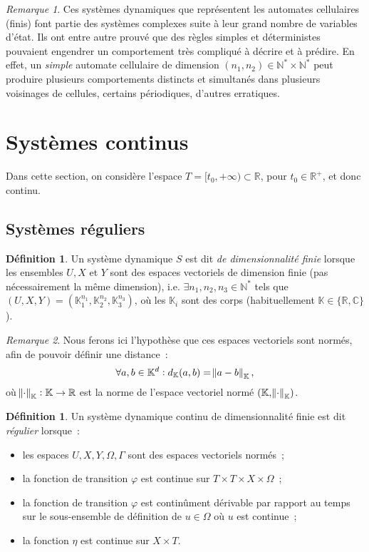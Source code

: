 \documentclass{article}
\theoremstyle{definition}
\newtheorem{déf}[thm]{Définition}
\theoremstyle{remark}
\newtheorem*{rmq}{Remarque}
\newcommand{\N}{\mathbb N}
\newcommand{\R}{\mathbb R}
\newcommand{\C}{\mathbb C}
\newcommand{\K}{\mathbb K}
\begin{document}
	\begin{rmq} Ces systèmes dynamiques que représentent les automates cellulaires (finis) font partie des systèmes complexes suite à leur grand nombre de
	variables d'état. Ils ont entre autre prouvé que des règles simples et déterministes pouvaient engendrer un comportement très compliqué à décrire et à
	prédire. En effet, un \textit{simple} automate cellulaire de dimension $(n_1, n_2) \in \N^* \times \N^*$ peut produire plusieurs comportements distincts
	et simultanés dans plusieurs voisinages de cellules, certains périodiques, d'autres erratiques.
	\end{rmq}

\section{Systèmes continus}
	Dans cette section, on considère l'espace $T = [t_0, +\infty) \subset \R$, pour $t_0 \in \R^+$, et donc continu.

	\subsection{Systèmes réguliers}

	\begin{déf} Un système dynamique $S$ est dit \textit{de dimensionnalité finie} lorsque les ensembles $U, X$ et $Y$ sont des espaces vectoriels de dimension
	finie (pas nécessairement la même dimension), i.e. $\exists n_1, n_2, n_3 \in \N^*$ tels que $(U, X, Y) = (\K_1^{n_1}, \K_2^{n_2}, \K_3^{n_3})$, où
	les $\K_i$ sont des corps (habituellement $\K \in \{\R, \C\}$).
	\end{déf}

	\begin{rmq} Nous ferons ici l'hypothèse que ces espaces vectoriels sont normés, afin de pouvoir définir une distance~:
	\[\forall a, b \in \K^d : d_\K(a, b) = \norm {a-b}_\K,\]
	où $\norm \cdot_\K : \K \to \R$ est la norme de l'espace vectoriel normé $(\K, \norm \cdot_\K)$.
	\end{rmq}

	\begin{déf} Un système dynamique continu de dimensionnalité finie est dit \textit {régulier} lorsque~:
	\begin{itemize}
		\item les espaces $U, X, Y, \Omega, \Gamma$ sont des espaces vectoriels normés~;
		\item la fonction de transition $\varphi$ est continue sur $T \times T \times X \times \Omega$~;
		\item la fonction de transition $\varphi$ est continûment dérivable par rapport au temps sur le sous-ensemble de définition de $u \in \Omega$ où
			$u$ est continue~;
		\item la fonction $\eta$ est continue sur $X \times T$.
	\end{itemize}
	\end{déf}
\end{document}
